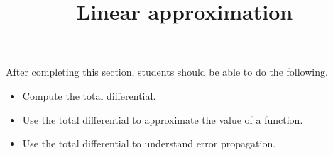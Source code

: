 \documentclass{ximera}
\title{Linear approximation}
\begin{document}
\begin{abstract}
\end{abstract}

\maketitle

\begin{sectionOutcomes}

After completing this section, students should be able to do the following.

\begin{itemize}
\item Compute the total differential.
\item Use the total differential to approximate the value of a function.
\item Use the total differential to understand error propagation. 
\end{itemize}

\end{sectionOutcomes}
\end{document}
